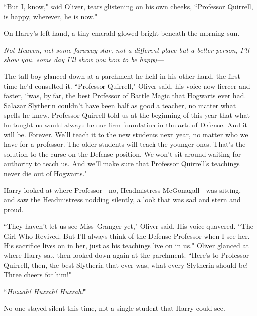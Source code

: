``But I, know," said Oliver, tears glistening on his own cheeks, ``Professor Quirrell, is happy, wherever, he is now."

On Harry's left hand, a tiny emerald glowed bright beneath the morning sun.

\emph{Not Heaven, not some faraway star, not a different place but a better person, I'll show you, some day I'll show you how to be happy—}

The tall boy glanced down at a parchment he held in his other hand, the first time he'd consulted it. ``Professor Quirrell," Oliver said, his voice now fiercer and faster, ``was, by far, the best Professor of Battle Magic that Hogwarts ever had. Salazar Slytherin couldn't have been half as good a teacher, no matter what spells he knew. Professor Quirrell told us at the beginning of this year that what he taught us would always be our firm foundation in the arts of Defense. And it will be. Forever. We'll teach it to the new students next year, no matter who we have for a professor. The older students will teach the younger ones. That's the solution to the curse on the Defense position. We won't sit around waiting for authority to teach us. And we'll make sure that Professor Quirrell's teachings never die out of Hogwarts."

Harry looked at where Professor—no, Headmistress McGonagall—was sitting, and saw the Headmistress nodding silently, a look that was sad and stern and proud.

``They haven't let us see Miss~Granger yet," Oliver said. His voice quavered. ``The Girl-Who-Revived. But I'll always think of the Defense Professor when I see her. His sacrifice lives on in her, just as his teachings live on in us." Oliver glanced at where Harry sat, then looked down again at the parchment. ``Here's to Professor Quirrell, then, the best Slytherin that ever was, what every Slytherin should be! Three cheers for him!"

``\emph{Huzzah! Huzzah! Huzzah!}"

No-one stayed silent this time, not a single student that Harry could see.

